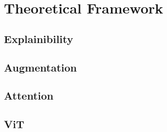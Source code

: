 
\section{Theoretical Framework} \label{section:thero}

\subsection*{Explainibility}
\subsection*{Augmentation}
\subsection*{Attention}
\subsection*{ViT}
